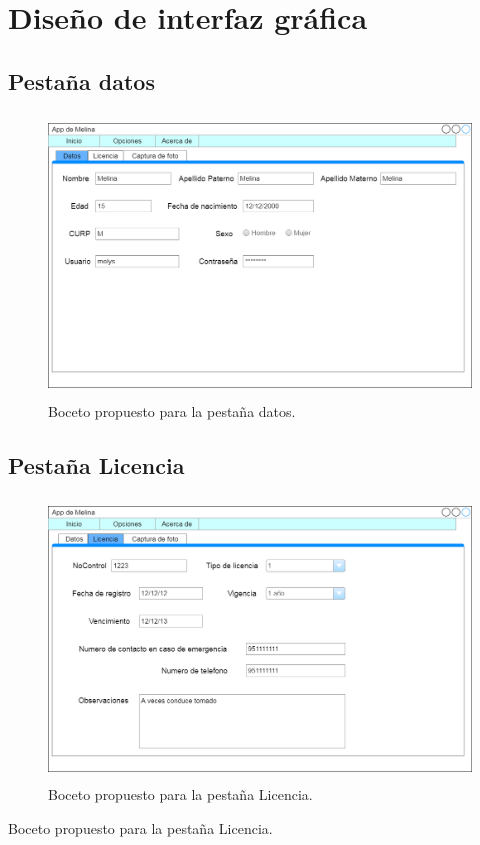 \section{Diseño de interfaz gráfica}
		\subsection{Pestaña datos}
			\begin{figure}[h]
			\centering
				\includegraphics[height=7.5cm]{img/gui_datos}
				\caption{Boceto propuesto para la pestaña datos.}		
				\label{Pestaña datos}
			\end{figure}
			
		\subsection{Pestaña Licencia}
			\begin{figure}[h]
			\centering
				\includegraphics[height=7.5cm]{img/gui_licencia}
				\caption{Boceto propuesto para la pestaña Licencia.}		
				\label{Pestaña Licencia}
			\end{figure}
			Boceto propuesto para la pestaña Licencia.
			
